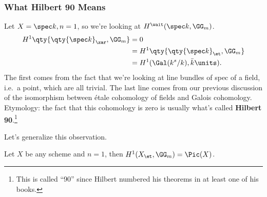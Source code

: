 \hypertarget{what-hilbert-90-means}{%
\subsubsection{What Hilbert 90 Means}\label{what-hilbert-90-means}}

\begin{example}[?]

Let \(X = \spec k, n=1\), so we're looking at
\(H^\wait(\spec k, \GG_m)\).
\begin{align*}  
H^1 \qty{ \qty{ \spec k}_\zar, \GG_m} 
&= 0 \\
&= 
H^1 \qty{ \qty{ \spec k}_\et, \GG_m}  \\
&=
H^1(\Gal(k^s / k), \bar k \units)
.\end{align*} The first comes from the fact that we're looking at line
bundles of spec of a field, i.e.~a point, which are all trivial. The
last line comes from our previous discussion of the isomorphism between
étale cohomology of fields and Galois cohomology. Etymology: the fact
that this cohomology is zero is usually what's called \textbf{Hilbert
90}.\footnote{This is called ``90'' since Hilbert numbered his theorems
  in at least one of his books.}

\end{example}

Let's generalize this observation.

\begin{example}[?]

Let \(X\) be any scheme and \(n=1\), then
\(H^1(X_\et, \GG_m) = \Pic(X)\).

\end{example}

